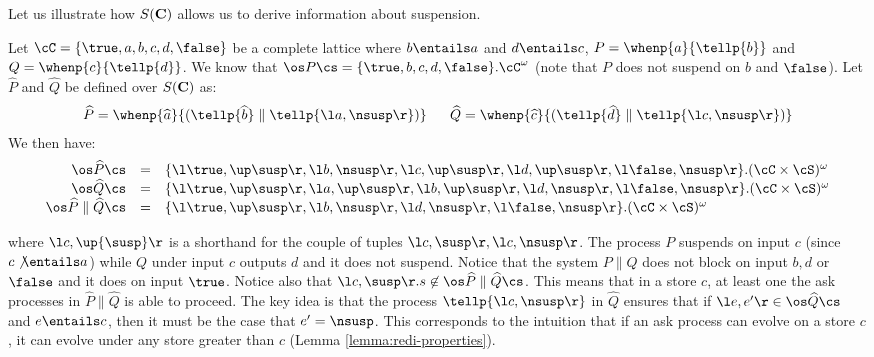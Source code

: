 \documentclass{tlp}
\begin{document}
Let us illustrate  how   $S({\bf C})$ allows us to derive information about suspension. 

\begin{example}\label{ex:col-sem}
Let  $\cC= \{\true,a,b,c,d,\false\}$ be a complete lattice where $b\entails a$ and $d\entails c$, 
$P=\whenp{a}{\tellp{b}}$ and 
$Q=\whenp{c}{\tellp{d}}$.  We know that 
$
\os P\cs = \{\true, b, c , d , \false \}.\cC^\omega
$ (note  that $P$  does not suspend on 
$b$ and $\false$). Let $\widehat{P}$ and $\widehat{Q}$ be defined over  $S({\bf C})$ as:
\[
\begin{array}{lll}
\widehat{P} = \whenp{\widehat{a}}{(\tellp{\widehat{b}} \parallel \tellp{\l a, \nsusp \r})} & \!\! &
\widehat{Q} = \whenp{\widehat{c}}{(\tellp{\widehat{d}} \parallel \tellp{\l c, \nsusp \r})} \\
\end{array}
\]
We then have:
\[
\begin{array}{rll}
\os \widehat{P}\cs &=& \{\l \true,\up\susp\r, \l b,\nsusp\r, \l c ,\up\susp\r , \l d ,\up\susp\r, \l \false,\nsusp\r \}.(\cC\times \cS)^\omega\\
\os \widehat{Q}\cs &=& \{\l \true,\up\susp\r, \l a,\up\susp\r, \l b ,\up\susp\r , \l d ,\nsusp\r, \l \false,\nsusp\r \}.(\cC\times \cS)^\omega\\
\os \widehat{P}\parallel \widehat{Q}\cs & = & \{\l \true,\up\susp\r, \l b,\nsusp\r, \l d ,\nsusp\r, \l \false,\nsusp\r \}.(\cC\times \cS)^\omega
\end{array}
\]



\end{example}








where $\l c, \up{\susp}\r$ is a shorthand for the couple of tuples  $\l c, \susp\r, \l c, \nsusp\r$. 
The process $P$ suspends on input $c$ (since $c\not\entails a$) while $Q$ under input $c$ outputs $d$ and it does not suspend. Notice that the system  $P\parallel Q$ does not block on input $b,d$ or $\false$ and it does on input $\true$. Notice also  that $\l c,\susp \r.s \not\in \os \widehat{P} \parallel \widehat{Q} \cs$. This means that in a store $c$, 
 at least one the ask processes in  $\widehat{P} \parallel \widehat{Q}$ is able to proceed. 
The key idea is that the process $\tellp{\l c,\nsusp \r}$ in $\widehat{Q}$ ensures that if $\l e, e'\r \in \os \widehat{Q}\cs$ and  $e\entails c$, then it must be the case that  $e'=\nsusp$. This corresponds to the intuition that if an ask process can evolve on a store $c$, it can evolve under any store greater than $c$ (Lemma \ref{lemma:redi-properties}). 
\end{document}
